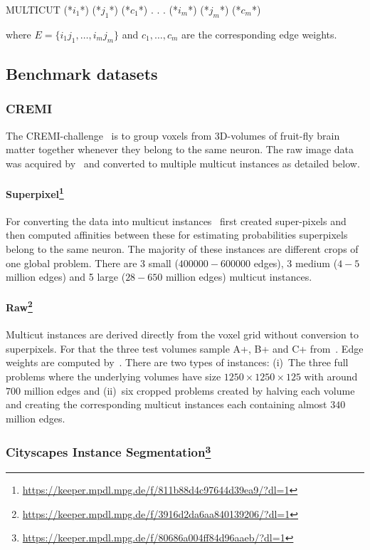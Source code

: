 \begin{fileformat}
MULTICUT
(*$i_1$*) (*$j_1$*) (*$c_1$*)
.
.
.
(*$i_m$*) (*$j_m$*) (*$c_m$*)
\end{fileformat}
where $E = \{i_1 j_1, \ldots, i_m j_m\}$ and $c_1,\ldots,c_m$ are the corresponding edge weights.

\subsection{Benchmark datasets}

\subsubsection{CREMI}
The CREMI-challenge~\cite{cremi} is to group voxels from 3D-volumes of fruit-fly brain matter together whenever they belong to the same neuron.
The raw image data was acquired by~\cite{zheng2018complete} and converted to multiple multicut instances as detailed below.

\paragraph{Superpixel\footnote{\url{https://keeper.mpdl.mpg.de/f/811b88d4c97644d39ea9/?dl=1}}}
For converting the data into multicut instances~\cite{pape2017solving} first created super-pixels and then computed affinities between these for estimating probabilities superpixels belong to the same neuron.
The majority of these instances are different crops of one global problem.
There are 3 small ($400000-600000$ edges), 3 medium ($4-5$ million edges) and 5 large ($28-650$ million edges) multicut instances.

\paragraph{Raw\footnote{\url{https://keeper.mpdl.mpg.de/f/3916d2da6aa840139206/?dl=1}}}
Multicut instances are derived directly from the voxel grid without conversion to superpixels.
For that the three test volumes sample A+, B+ and C+ from~\cite{cremi}.
Edge weights are computed by~\cite{torch_EM}.
There are two types of instances:
(i)~The three full problems where the underlying volumes have size $1250 \times 1250 \times 125$ with around $700$ million edges and
(ii)~six cropped problems created by halving each volume and creating the corresponding multicut instances each containing almost $340$ million edges.

\subsubsection[Cityscapes Instance Segmentation]{Cityscapes Instance Segmentation\footnote{\url{https://keeper.mpdl.mpg.de/f/80686a004ff84d96aaeb/?dl=1}}}

